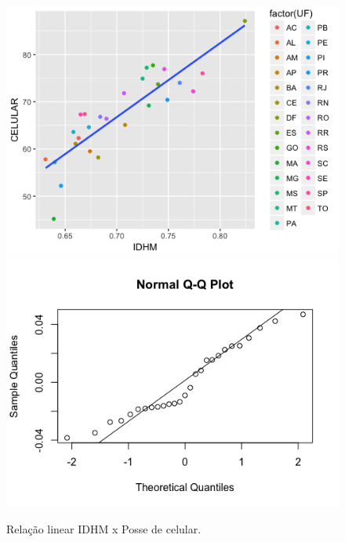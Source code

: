\documentclass[journal]{IEEEtran}
\begin{document}




\begin{figure}[H]
\center
{\includegraphics[scale=0.3]{./figuras/LM-IDHMxCELULAR.png} \quad
\includegraphics[scale=0.3]{./figuras/QQNORM-IDHMxCELULAR.png}}
\caption{Relação linear IDHM x Posse de celular.}
\label{LM-IDHMxCELULAR}
\end{figure}
\end{document}
